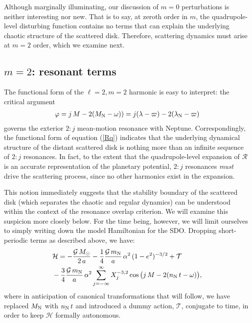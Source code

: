 \documentclass[twocolumn]{aastex62}
\newcommand{\G}{\mathcal{G}}
\newcommand{\Msun}{M_{\odot}}
\newcommand{\R}{\mathcal{R}}
\newcommand{\Ham}{\mathcal{H}}
\newcommand{\mn}{m_{\rm{N}}}
\newcommand{\Mn}{M_{\rm{N}}}
\begin{document}
Although marginally illuminating, our discussion of $m=0$ perturbations is neither interesting nor new. That is to say, at zeroth order in $m$, the quadrupole-level disturbing function contains no terms that can explain the underlying chaotic structure of the scattered disk. Therefore, scattering dynamics must arise at $m=2$ order, which we examine next. 

\subsection{$m=2$: resonant terms}
The functional form of the $\ell=2,m=2$ harmonic is easy to interpret: the critical argument
\begin{align}
\varphi=j\,M- 2(\Mn-\omega))=j(\lambda-\varpi)-2(\lambda_{\rm{N}}-\varpi)
\label{varphi}
\end{align}
governs the exterior $2:j$ mean-motion resonance with Neptune. Correspondingly, the functional form of equation (\ref{Rq}) indicates that the underlying dynamical structure of the distant scattered disk is nothing more than an infinite sequence of $2:j$ resonances. In fact, to the extent that the quadrupole-level expansion of $\R$ is an accurate representation of the planetary potential, $2:j$ resonances \textit{must} drive the scattering process, since no other harmonics exist in the expansion.

This notion immediately suggests that the stability boundary of the scattered disk (which separates the chaotic and regular dynamics) can be understood within the context of the \citet{Chirikov1979} resonance overlap criterion. We will examine this suspicion more closely below. For the time being, however, we will limit ourselves to simply writing down the model Hamiltonian for the SDO. Dropping short-periodic terms as described above, we have:
\begin{align}
&\Ham=-\frac{\G\,\Msun}{2\,a} - \frac{1}{4} \frac{\G\,\mn}{a}\, \alpha^2 \, (1-e^2)^{-3/2} +\mathcal{T} \nonumber \\
&- \frac{3}{4} \frac{\G\,\mn}{a}\, \alpha^2  \sum_{j = -\infty}^{\infty} X_{j}^{-3,2} \cos\big(j\,M- 2(n_{\rm{N}}\,t-\omega)\big),
\label{Hammy}
\end{align}
where in anticipation of canonical transformations that will follow, we have replaced $\Mn$ with $n_{\rm{N}}\,t$ and introduced a dummy action, $\mathcal{T}$, conjugate to time, in order to keep $\Ham$ formally autonomous.
\end{document}
